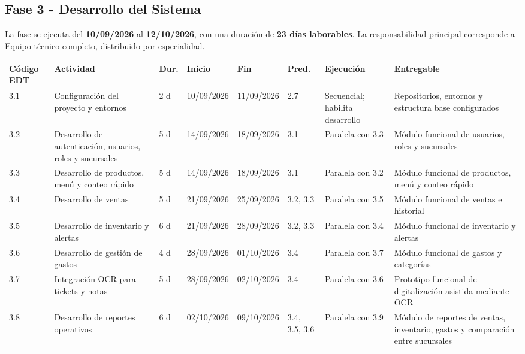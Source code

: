 \documentclass[12pt,a4paper]{article}
\begin{document}
\begin{landscape}
\subsection{Fase 3 - Desarrollo del Sistema}

La fase se ejecuta del \textbf{10/09/2026} al \textbf{12/10/2026}, con una duración de \textbf{23 días laborables}. 
La responsabilidad principal corresponde a Equipo técnico completo, distribuido por especialidad.

\begin{center}
\setlength{\tabcolsep}{3pt}
\renewcommand{\arraystretch}{1.15}
\fontsize{7.2}{8.5}\selectfont
\begin{tabularx}{\linewidth}{|p{0.85cm}|p{4.0cm}|p{0.75cm}|p{1.45cm}|p{1.45cm}|p{1.4cm}|p{4.0cm}|X|}
\hline
\rowcolor{tableheader}
\textbf{Código EDT} & \textbf{Actividad} & \textbf{Dur.} & \textbf{Inicio} & \textbf{Fin} & \textbf{Pred.} & \textbf{Ejecución} & \textbf{Entregable} \\ \hline
3.1 & Configuración del proyecto y entornos & 2 d & 10/09/2026 & 11/09/2026 & 2.7 & Secuencial; habilita desarrollo & Repositorios, entornos y estructura base configurados \\ \hline
3.2 & Desarrollo de autenticación, usuarios, roles y sucursales & 5 d & 14/09/2026 & 18/09/2026 & 3.1 & Paralela con 3.3 & Módulo funcional de usuarios, roles y sucursales \\ \hline
3.3 & Desarrollo de productos, menú y conteo rápido & 5 d & 14/09/2026 & 18/09/2026 & 3.1 & Paralela con 3.2 & Módulo funcional de productos, menú y conteo rápido \\ \hline
3.4 & Desarrollo de ventas & 5 d & 21/09/2026 & 25/09/2026 & 3.2, 3.3 & Paralela con 3.5 & Módulo funcional de ventas e historial \\ \hline
3.5 & Desarrollo de inventario y alertas & 6 d & 21/09/2026 & 28/09/2026 & 3.2, 3.3 & Paralela con 3.4 & Módulo funcional de inventario y alertas \\ \hline
3.6 & Desarrollo de gestión de gastos & 4 d & 28/09/2026 & 01/10/2026 & 3.4 & Paralela con 3.7 & Módulo funcional de gastos y categorías \\ \hline
3.7 & Integración OCR para tickets y notas & 5 d & 28/09/2026 & 02/10/2026 & 3.4 & Paralela con 3.6 & Prototipo funcional de digitalización asistida mediante OCR \\ \hline
3.8 & Desarrollo de reportes operativos & 6 d & 02/10/2026 & 09/10/2026 & 3.4, 3.5, 3.6 & Paralela con 3.9 & Módulo de reportes de ventas, inventario, gastos y comparación entre sucursales \\ \hline

\end{tabularx}
\end{center}
\end{landscape}
\end{document}
